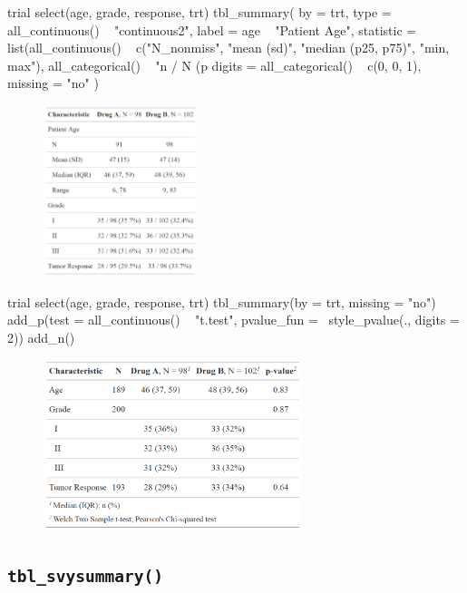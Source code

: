 
\begin{example}
trial %
  select(age, grade, response, trt) %
  tbl_summary(
    by = trt,
    type = all_continuous() ~ "continuous2",
    label = age ~ "Patient Age",
    statistic = list(all_continuous() ~ c("{N_nonmiss}", 
                                          "{mean} ({sd})", 
                                          "{median} ({p25}, {p75})", 
                                          "{min}, {max}"),
                     all_categorical() ~ "{n} / {N} ({p}%
    digits = all_categorical() ~ c(0, 0, 1),
    missing = "no"
  )
\end{example}
\begin{figure}[h!]
  \includegraphics[height=5cm]{summary_plus.png}
  \centering
\end{figure}


\begin{example}
trial %
  select(age, grade, response, trt) %
  tbl_summary(by = trt, missing = "no") %
  add_p(test = all_continuous() ~ "t.test",
        pvalue_fun = ~style_pvalue(., digits = 2)) %
  add_n()
\end{example}
\begin{figure}[h!]
  \includegraphics[height=5cm]{summary_plus_plus.png}
  \centering
\end{figure}

\subsection{\texorpdfstring{\texttt{tbl\_svysummary()}}{tbl\_svysummary()}}

